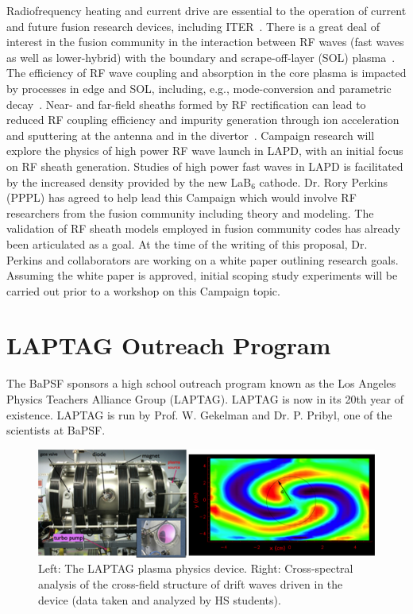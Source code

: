 \documentclass[11pt]{article}
\renewcommand{\cite}{\citep}
\begin{document}
 Radiofrequency heating and
  current drive are essential to the operation of current and future
  fusion research devices, including ITER~\cite{jaeger:2008}.  There is a great deal of
  interest in the fusion community in the interaction between RF waves
  (fast waves as well as lower-hybrid) with the boundary and
  scrape-off-layer (SOL) plasma~\cite{wallace:2011,jacquet:2011}.  The efficiency of RF wave coupling and
  absorption in the core plasma is impacted by processes in edge and
  SOL, including, e.g., mode-conversion and parametric decay~\cite{wukitch:2007,rost:2002}.  Near-
  and far-field sheaths formed by RF rectification can lead to reduced
  RF coupling efficiency and impurity generation through ion
  acceleration and sputtering at the antenna and in the divertor~\cite{ochoukov:2013,dippolito:2013}.
  Campaign research will explore the physics of high power RF wave
  launch in LAPD, with an initial focus on RF sheath generation.
  Studies of high power fast waves in LAPD is facilitated by the
  increased density provided by the new LaB$_6$ cathode.  Dr. Rory
  Perkins (PPPL) has agreed to help lead this Campaign which would
  involve RF researchers from the fusion community including theory
  and modeling.  The validation of RF sheath models employed in fusion
  community codes has already been articulated as a goal.  At the time of
  the writing of this proposal, Dr. Perkins and collaborators are working on a
  white paper outlining research goals.  Assuming the white paper is
  approved, initial scoping study experiments will be carried out
  prior to a workshop on this Campaign topic.  


\section{LAPTAG Outreach Program}

The BaPSF sponsors a high school outreach program known as the Los Angeles Physics Teachers Alliance Group  (LAPTAG).  
LAPTAG is now in its 20th year of existence.  LAPTAG is run by
Prof. W. Gekelman and Dr. P. Pribyl, one of the 
scientists at BaPSF.

\begin{figure}[!htbp]
\centerline{
\includegraphics[width=6.0truein]{laptag_fig}}
\caption{Left: The LAPTAG plasma physics device.  Right: Cross-spectral analysis of the
cross-field structure of drift waves driven in the device (data taken
and analyzed by HS students).}\label{laptag}
\end{figure}
\end{document}
